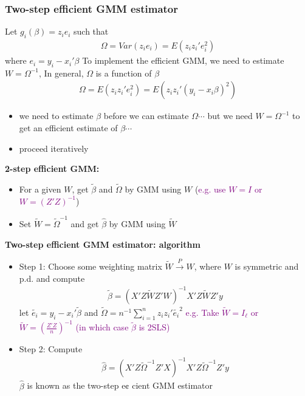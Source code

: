 \documentclass[a4paper,twoside,11pt]{article}
\begin{document}
\subsubsection{Two-step efficient GMM estimator}
Let $g_i (\beta) = z_ie_i$ such that
\begin{equation*}
\begin{aligned}
\Omega = Var(z_ie_i) =E(z_iz_i'e_i^2)
\end{aligned} 
\end{equation*}
where $e_i = y_i - x_i' \beta$
\newline
\newline
To implement the efficient GMM, we need to estimate $W = \Omega^{-1}$, In general, $\Omega$ is a function of $\beta$
\begin{equation*}
\begin{aligned}
\Omega = E(z_iz_i'e_i^2) = E(z_i z_i' (y_i - x_i \beta)^2) 
\end{aligned} 
\end{equation*}
\begin{itemize}
    \item we need to estimate $\beta$ before we can estimate $\Omega \cdots $ but we need $W= \Omega^{-1}$ to get an efficient estimate of $\beta \cdots$
    \item proceed iteratively
\end{itemize}
\textbf{2-step efficient GMM:}
\begin{itemize}
    \item For a given $W$, get $\tilde{\beta}$ and $\tilde{\Omega}$ by GMM using $W$ (\textcolor{Purple}{e.g. use $W=I$ or $W=(Z'Z)^{-1}$})
    \item Set $\tilde{W} = \tilde{\Omega}^{-1}$ and get $\hat{\beta}$ by GMM using $\tilde{W}$
\end{itemize}
\textbf{Two-step efficient GMM estimator: algorithm}
\begin{itemize}
    \item \textcolor{NavyBlue}{Step 1:} Choose some weighting matrix $\tilde{W} \overset{P}{\rightarrow} W$, where $W$ is symmetric and p.d. and compute
\begin{equation*}
\begin{aligned}
\tilde{\beta} = (X'Z \tilde{W} Z'W)^{-1}X'Z \tilde{W}Z'y
\end{aligned} 
\end{equation*}
let $\tilde{e_i} = y_i - x_i' \tilde{\beta}$ and $\tilde{\Omega} = n^{-1} \sum^n_{i=1} z_i z_i' \tilde{e_i}^2$
\newline
\newline
\textcolor{Purple}{e.g. Take $\tilde{W} = I_\ell$ or $\tilde{W} = (\frac{Z'Z}{n})^{-1}$ (in which case $\tilde{\beta}$ is 2SLS)}
    \item \textcolor{NavyBlue}{Step 2:} Compute
\begin{equation*}
\begin{aligned}
\hat{\beta} = (X'Z \tilde{\Omega}^{-1}Z'X)^{-1} X'Z \tilde{\Omega}^{-1}Z'y
\end{aligned} 
\end{equation*}
$\hat{\beta}$ is known as the two-step e¢ cient GMM estimator
\end{itemize}
\end{document}
